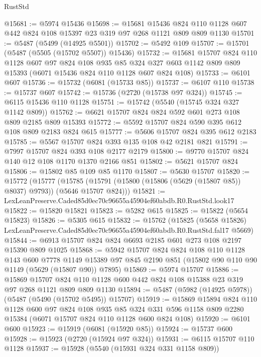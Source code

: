 \begin{lexlean}{RustStd}
\begin{coremodule}
@15681 := @5974 @15436
@15698 := @15681
    @15436
    @824
    @110
    @1128
    @607
    @442
    @824
    @108
    @15397
    @23
    @319
    @97
    @268
    @1121
    @809
    @809
    @1130
@15701 := @5487 (@5499 (@14925 @5501))
@15702 := @5492 @109
@15707 := @15701 (@5487 (@5505 (@15702 @5507)) @15436)
@15732 := @15681
    @15707
    @824
    @110
    @1128
    @607
    @97
    @824
    @108
    @935
    @85
    @324
    @327
    @603
    @1142
    @809
    @809
    @15393
    (@6071 @15436 @824 @110 @1128 @607 @824 @108)
@15733 := @6101 @607
@15736 := @15732 (@6081 (@15733 @85))
@15737 := @6107 @110
@15738 := @15737 @607
@15742 := @15736 (@2720 (@15738 @97 @324))
@15745 := @6115 @15436 @110 @1128
@15751 := @15742 (@5540 (@15745 @324 @327 @1142 @809))
@15762 := @6621 @15707 @824 @824 @592 @601 @273 @108 @809 @2185 @809 @15393
@15772 := @5592 @15707 @824 @590 @395 @612 @108 @809 @2183 @824 @615
@15777 := @5606 @15707 @824 @395 @612 @2183
@15785 := @5567 @15707 @824 @393 @135 @108 @42 @2181 @821
@15791 := @7997 @15707 @824 @393 @108 @2177 @2179
@15800 := @9770 @15707 @824 @140 @12 @108 @1170 @1370 @2166 @851
@15802 := @5621 @15707 @824
@15806 := @15802 @85 @109 @85 @1170
@15807 := @5630 @15707
@15820 := @15772
    (@15777
      (@15785 (@15791 (@15800 (@15806 (@5629 (@15807 @85)) @8037) @9793)) (@5646 @15707 @824)))
@15821 := LexLeanPreserve.Caded85d0ec70c96655a45904ef60abdb.R0.RustStd.look17
@15822 := @15820 @15821
@15823 := @5282 @615
@15825 := @15822 (@5654 @15823)
@15826 := @5305 @615
@15832 := @15762
    (@15825 (@5658 @15826) LexLeanPreserve.Caded85d0ec70c96655a45904ef60abdb.R0.RustStd.fal17 @5669)
@15844 := @6913 @15707 @824 @824 @6693 @2185 @601 @273 @108 @2197 @15390 @809 @1025
@15868 := @5942
    @15707
    @824
    @824
    @108
    @110
    @1128
    @143
    @600
    @7778
    @1149
    @15389
    @97
    @845
    @2190
    @851
    (@15802 @90 @110 @90 @1149 (@5629 (@15807 @90)) @7895)
@15869 := @5974 @15707
@15886 := @15869
    @15707
    @824
    @110
    @1128
    @600
    @442
    @824
    @108
    @15388
    @23
    @319
    @97
    @268
    @1121
    @809
    @809
    @1130
@15894 := @5487 (@5982 (@14925 @5978)) (@5487 (@5490 (@15702 @5495)) @15707)
@15919 := @15869
    @15894
    @824
    @110
    @1128
    @600
    @97
    @824
    @108
    @935
    @85
    @324
    @331
    @596
    @1158
    @809
    @2280
    @15384
    (@6071 @15707 @824 @110 @1128 @600 @824 @108)
@15920 := @6101 @600
@15923 := @15919 (@6081 (@15920 @85))
@15924 := @15737 @600
@15928 := @15923 (@2720 (@15924 @97 @324))
@15931 := @6115 @15707 @110 @1128
@15937 := @15928 (@5540 (@15931 @324 @331 @1158 @809))

\end{coremodule}
\end{lexlean}
